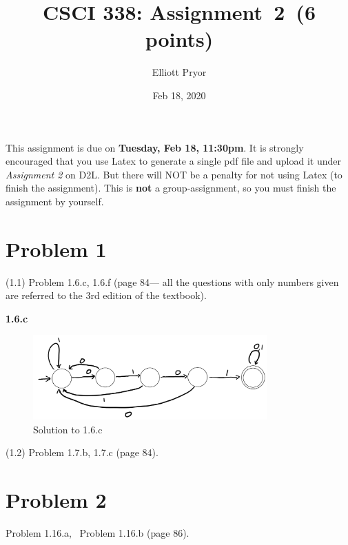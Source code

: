 \documentclass[11pt]{article}
\begin{document}
\date{Feb 18, 2020}
\title{CSCI 338: Assignment~2~(6 points)}

\author{Elliott Pryor}


\maketitle

\noindent
This assignment is due on {\bf Tuesday, Feb 18, 11:30pm}. It is strongly
encouraged that you use Latex to generate a single pdf file and upload it
under {\em Assignment 2} on D2L. But there will NOT be a penalty for not
using Latex (to finish the assignment). This is {\bf not} a group-assignment,
so you must finish the assignment by yourself.

\newpage
\section*{Problem 1}

\noindent
(1.1) Problem 1.6.c, 1.6.f (page 84---
all the questions with only numbers given are referred to the 3rd edition of the textbook).
\newline

\textbf{1.6.c}

 \begin{figure}[h!]
     \centering
     \includegraphics[width = 0.8\textwidth]{16c_CSCI338.PNG}
     \caption{Solution to 1.6.c}
     \label{fig:1.6.c}
 \end{figure}

\noindent
(1.2) Problem 1.7.b, 1.7.c (page 84).
\newline

\newpage
\section*{Problem 2}

Problem 1.16.a, ~Problem 1.16.b (page 86).
\newline
\end{document}
